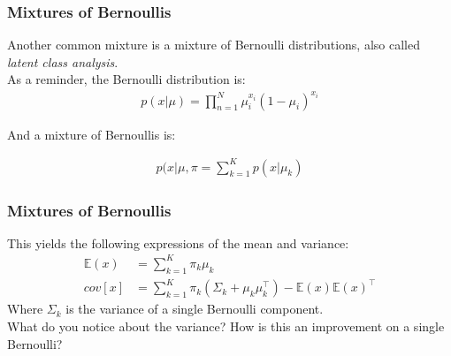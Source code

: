 \documentclass{beamer}
\begin{document}
\begin{frame}
\frametitle{Mixtures of Bernoullis}
	Another common mixture is a mixture of Bernoulli distributions, also called \textit{latent class analysis}.\\
	As a reminder, the Bernoulli distribution is:
	\begin{align*}
	p(x|\mu) = \prod_{n = 1}^{N} \mu_i^{x_i}(1 - \mu_i)^{x_i}
	\end{align*}
	
	And a mixture of Bernoullis is:
	
	\begin{align*}
		p(x|\mu, \pi = \sum_{k=1}^{K}p(x|\mu_k) 
	\end{align*}
\end{frame}


\begin{frame}
\frametitle{Mixtures of Bernoullis}
	This yields the following expressions of the mean and variance:
	\begin{align*}
	\mathbb{E}(x)& = \sum_{k=1}^{K} \pi_k \mu_k \\
	cov[x]  &= \sum_{k=1}^{K}  \pi_k (\Sigma_k + \mu_k \mu_k^{\intercal}) - \mathbb{E}(x)\mathbb{E}(x)^{\intercal}
	\end{align*}
	Where $\Sigma_{k}$ is the variance of a single Bernoulli component.\\
	What do you notice about the variance? How is this an improvement on a single Bernoulli?
\end{frame}
\end{document}
